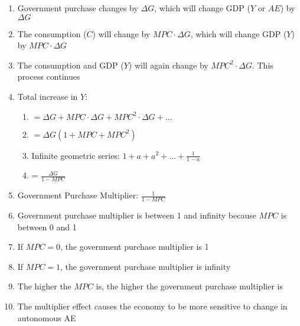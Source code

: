 \documentclass[12pt]{article}
\begin{document}
\begin{enumerate}
\begin{enumerate}
            \begin{enumerate}

              \item Government purchase changes by $\Delta G$, which will change GDP ($Y$ or $AE$) by $\Delta G$

              \item The consumption ($C$) will change by $MPC\cdot\Delta G$, which will change GDP ($Y$) by $MPC\cdot\Delta G$

              \item The consumption and GDP ($Y$) will again change by $MPC^2\cdot\Delta G$. This process continues

              \item Total increase in $Y$:

                \begin{enumerate}

                  \item $=\Delta G + MPC\cdot\Delta G + MPC^2\cdot\Delta G+\dots$

                  \item $=\Delta G(1 + MPC + MPC^2)$

                  \item Infinite geometric series: $1 + a + a^2 + \dots + \frac{1}{1-a}$

                  \item = $\frac{\Delta G}{1-MPC}$

                \end{enumerate}

              \item Government Purchase Multiplier: $\frac{1}{1-MPC}$

              \item Government purchase multiplier is between 1 and infinity because $MPC$ is between 0 and 1

              \item If $MPC=0$, the government purchase multiplier is 1

              \item If $MPC=1$, the government purchase multiplier is infinity

              \item The higher the $MPC$ is, the higher the government purchase multiplier is

              \item The multiplier effect causes the economy to be more sensitive to change in autonomous AE


\end{enumerate}
\end{enumerate}
\end{enumerate}
\end{document}
